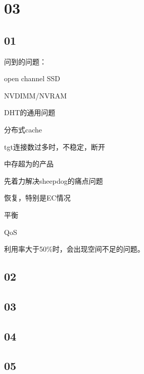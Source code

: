 \section{03}

\subsection{01}

问到的问题：
\begin{enumbox}
\item open channel SSD
\item NVDIMM/NVRAM
\item DHT的通用问题
\item 分布式cache
\item tgt连接数过多时，不稳定，断开
\item 中存超为的产品
\end{enumbox}

先着力解决sheepdog的痛点问题
\begin{enumbox}
\item 恢复，特别是EC情况
\item 平衡
\item QoS
\end{enumbox}

利用率大于50\%时，会出现空间不足的问题。

\subsection{02}

\subsection{03}

\subsection{04}

\subsection{05}
